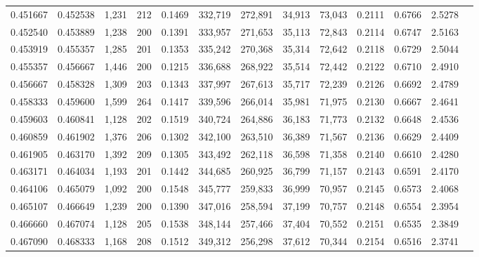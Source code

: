 \begin{tabular}{rrrrrrrrrrrrr}
0.451667 & 0.452538 &  1,231 &   212 &                                     0.1469 & 332,719 & 272,891 &  34,913 &  73,043 & 0.2111 & 0.6766 & 2.5278 \\
0.452540 & 0.453889 &  1,238 &   200 &                                     0.1391 & 333,957 & 271,653 &  35,113 &  72,843 & 0.2114 & 0.6747 & 2.5163 \\
0.453919 & 0.455357 &  1,285 &   201 &                                     0.1353 & 335,242 & 270,368 &  35,314 &  72,642 & 0.2118 & 0.6729 & 2.5044 \\
0.455357 & 0.456667 &  1,446 &   200 &                                     0.1215 & 336,688 & 268,922 &  35,514 &  72,442 & 0.2122 & 0.6710 & 2.4910 \\
0.456667 & 0.458328 &  1,309 &   203 &                                     0.1343 & 337,997 & 267,613 &  35,717 &  72,239 & 0.2126 & 0.6692 & 2.4789 \\
0.458333 & 0.459600 &  1,599 &   264 &                                     0.1417 & 339,596 & 266,014 &  35,981 &  71,975 & 0.2130 & 0.6667 & 2.4641 \\
0.459603 & 0.460841 &  1,128 &   202 &                                     0.1519 & 340,724 & 264,886 &  36,183 &  71,773 & 0.2132 & 0.6648 & 2.4536 \\
0.460859 & 0.461902 &  1,376 &   206 &                                     0.1302 & 342,100 & 263,510 &  36,389 &  71,567 & 0.2136 & 0.6629 & 2.4409 \\
0.461905 & 0.463170 &  1,392 &   209 &                                     0.1305 & 343,492 & 262,118 &  36,598 &  71,358 & 0.2140 & 0.6610 & 2.4280 \\
0.463171 & 0.464034 &  1,193 &   201 &                                     0.1442 & 344,685 & 260,925 &  36,799 &  71,157 & 0.2143 & 0.6591 & 2.4170 \\
0.464106 & 0.465079 &  1,092 &   200 &                                     0.1548 & 345,777 & 259,833 &  36,999 &  70,957 & 0.2145 & 0.6573 & 2.4068 \\
0.465107 & 0.466649 &  1,239 &   200 &                                     0.1390 & 347,016 & 258,594 &  37,199 &  70,757 & 0.2148 & 0.6554 & 2.3954 \\
0.466660 & 0.467074 &  1,128 &   205 &                                     0.1538 & 348,144 & 257,466 &  37,404 &  70,552 & 0.2151 & 0.6535 & 2.3849 \\
0.467090 & 0.468333 &  1,168 &   208 &                                     0.1512 & 349,312 & 256,298 &  37,612 &  70,344 & 0.2154 & 0.6516 & 2.3741 \\

\end{tabular}
